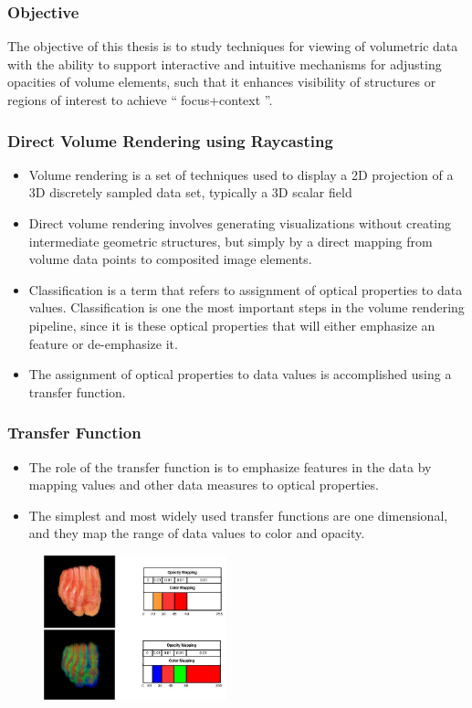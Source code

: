 \documentclass{beamer}
\begin{document}
\begin{frame}
\frametitle{Objective}
The objective of this thesis is to study techniques for viewing of volumetric data with the ability to support interactive and intuitive mechanisms for adjusting opacities of volume elements, such that it enhances visibility of structures or regions of interest to achieve  \textquotedblleft $\;$focus+context \textquotedblright.
\end{frame}



\begin{frame}
\frametitle{Direct Volume Rendering using Raycasting}
\begin{itemize}
\item Volume rendering is a set of techniques used to display a 2D projection of a 3D discretely sampled data set, typically a 3D scalar field
\item Direct volume rendering involves generating visualizations without creating intermediate geometric structures, but simply by a direct mapping from volume data points to composited image elements.
\item Classification is a term that refers to assignment of optical properties to data values. Classification is one the most important steps in the volume rendering pipeline, since it is these optical properties that will either emphasize an feature or de-emphasize it.
\item The assignment of optical properties to data values is accomplished using a transfer function.
\end{itemize}
\end{frame}



\begin{frame}
\frametitle{Transfer Function}
\begin{itemize}
\item The role of the transfer function is to emphasize features in the data by mapping values and other data measures to optical properties. 
\item The simplest and most widely used transfer functions are one dimensional, and they map the range of data values to color and opacity.
\end{itemize}
\begin{figure}
\centering
\includegraphics[width=150pt,heigth=280pt]{foot_different_TF.jpg}
\end{figure}
\end{frame}
\end{document}
